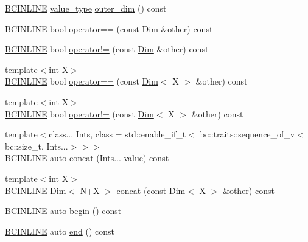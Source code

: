 \begin{DoxyCompactItemize}
\item 
\hyperlink{common_8h_a6699e8b0449da5c0fafb878e59c1d4b1}{B\+C\+I\+N\+L\+I\+NE} \hyperlink{structbc_1_1Dim_af59ff554825273cf6bd9619b2c78c196}{value\+\_\+type} \hyperlink{structbc_1_1Dim_a5d5e00f81269d265ae0095f4833f9cea}{outer\+\_\+dim} () const
\item 
\hyperlink{common_8h_a6699e8b0449da5c0fafb878e59c1d4b1}{B\+C\+I\+N\+L\+I\+NE} bool \hyperlink{structbc_1_1Dim_a67f98070634cf6f6b7bc1dfdd37cf63f}{operator==} (const \hyperlink{structbc_1_1Dim}{Dim} \&other) const
\item 
\hyperlink{common_8h_a6699e8b0449da5c0fafb878e59c1d4b1}{B\+C\+I\+N\+L\+I\+NE} bool \hyperlink{structbc_1_1Dim_a2f7c00b2f4bf452d357e36e4bf93e68f}{operator!=} (const \hyperlink{structbc_1_1Dim}{Dim} \&other) const
\item 
{\footnotesize template$<$int X$>$ }\\\hyperlink{common_8h_a6699e8b0449da5c0fafb878e59c1d4b1}{B\+C\+I\+N\+L\+I\+NE} bool \hyperlink{structbc_1_1Dim_a98ff3a660021beef1a5e0326a7704f94}{operator==} (const \hyperlink{structbc_1_1Dim}{Dim}$<$ X $>$ \&other) const
\item 
{\footnotesize template$<$int X$>$ }\\\hyperlink{common_8h_a6699e8b0449da5c0fafb878e59c1d4b1}{B\+C\+I\+N\+L\+I\+NE} bool \hyperlink{structbc_1_1Dim_a360349fe764e5681d79ec97bf7603107}{operator!=} (const \hyperlink{structbc_1_1Dim}{Dim}$<$ X $>$ \&other) const
\item 
{\footnotesize template$<$class... Ints, class  = std\+::enable\+\_\+if\+\_\+t$<$				bc\+::traits\+::sequence\+\_\+of\+\_\+v$<$bc\+::size\+\_\+t, Ints...$>$$>$$>$ }\\\hyperlink{common_8h_a6699e8b0449da5c0fafb878e59c1d4b1}{B\+C\+I\+N\+L\+I\+NE} auto \hyperlink{structbc_1_1Dim_a6e620bc0bff98d7a0ef71492dc7ef86a}{concat} (Ints... value) const
\item 
{\footnotesize template$<$int X$>$ }\\\hyperlink{common_8h_a6699e8b0449da5c0fafb878e59c1d4b1}{B\+C\+I\+N\+L\+I\+NE} \hyperlink{structbc_1_1Dim}{Dim}$<$ N+X $>$ \hyperlink{structbc_1_1Dim_af323953baa9138b64b4e703b1366f31a}{concat} (const \hyperlink{structbc_1_1Dim}{Dim}$<$ X $>$ \&other) const
\item 
\hyperlink{common_8h_a6699e8b0449da5c0fafb878e59c1d4b1}{B\+C\+I\+N\+L\+I\+NE} auto \hyperlink{structbc_1_1Dim_ad382835256ceedd117733b1676a6bd3e}{begin} () const
\item 
\hyperlink{common_8h_a6699e8b0449da5c0fafb878e59c1d4b1}{B\+C\+I\+N\+L\+I\+NE} auto \hyperlink{structbc_1_1Dim_ae4ac30383a187b53ca218e7fe15fcc5d}{end} () const

\end{DoxyCompactItemize}
